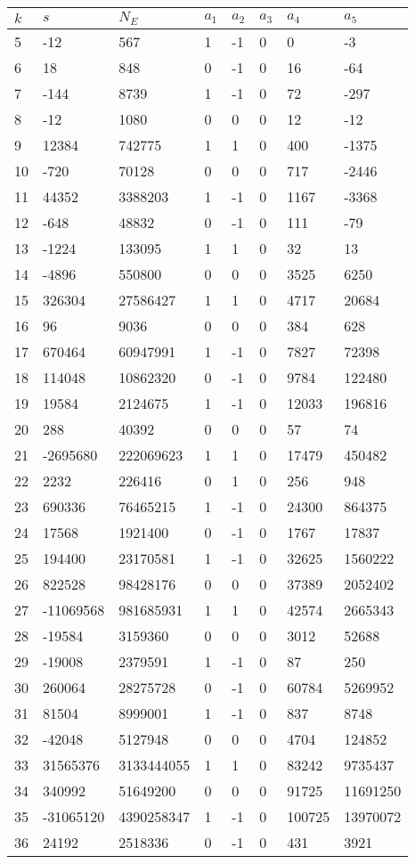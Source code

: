 \documentclass{amsart}
\begin{document}
\begin{longtable}{|l|l|l|lllll|}
\hline
$k$ & $s$ & $N_E$ & $a_1$ & $a_2$ & $a_3$ & $a_4$ & $a_5$\\
\hline
5&-12&567&1&-1&0&0&-3\\
6&18&848&0&-1&0&16&-64\\
7&-144&8739&1&-1&0&72&-297\\
8&-12&1080&0&0&0&12&-12\\
9&12384&742775&1&1&0&400&-1375\\
10&-720&70128&0&0&0&717&-2446\\
11&44352&3388203&1&-1&0&1167&-3368\\
12&-648&48832&0&-1&0&111&-79\\
13&-1224&133095&1&1&0&32&13\\
14&-4896&550800&0&0&0&3525&6250\\
15&326304&27586427&1&1&0&4717&20684\\
16&96&9036&0&0&0&384&628\\
17&670464&60947991&1&-1&0&7827&72398\\
18&114048&10862320&0&-1&0&9784&122480\\
19&19584&2124675&1&-1&0&12033&196816\\
20&288&40392&0&0&0&57&74\\
21&-2695680&222069623&1&1&0&17479&450482\\
22&2232&226416&0&1&0&256&948\\
23&690336&76465215&1&-1&0&24300&864375\\
24&17568&1921400&0&-1&0&1767&17837\\
25&194400&23170581&1&-1&0&32625&1560222\\
26&822528&98428176&0&0&0&37389&2052402\\
27&-11069568&981685931&1&1&0&42574&2665343\\
28&-19584&3159360&0&0&0&3012&52688\\
29&-19008&2379591&1&-1&0&87&250\\
30&260064&28275728&0&-1&0&60784&5269952\\
31&81504&8999001&1&-1&0&837&8748\\
32&-42048&5127948&0&0&0&4704&124852\\
33&31565376&3133444055&1&1&0&83242&9735437\\
34&340992&51649200&0&0&0&91725&11691250\\
35&-31065120&4390258347&1&-1&0&100725&13970072\\
36&24192&2518336&0&-1&0&431&3921\\

\end{longtable}
\end{document}
